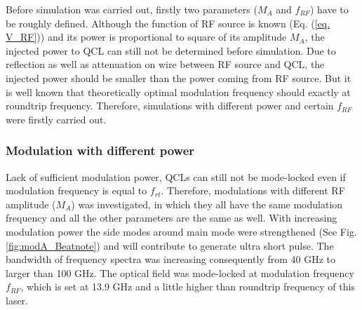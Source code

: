 \documentclass[11pt,final]{scrbook}
\begin{document}
Before simulation was carried out, firstly two parameters ($M_{A}$ and $f_{RF}$) have to be roughly defined. Although the function of RF source is known (Eq. (\ref{eq. V_RF})) and its power is proportional to square of its amplitude $M_{A}$, the injected power to QCL can still not be determined before simulation. Due to reflection as well as attenuation on wire between RF source and QCL, the injected power should be smaller than the power coming from RF source. But it is well known that theoretically optimal modulation frequency should exactly at roundtrip frequency. Therefore, simulations with different power and certain $f_{RF}$ were firstly carried out.
\subsubsection{Modulation with different power} 
Lack of sufficient modulation power, QCLs can still not be mode-locked even if modulation frequency is equal to $f_{rt}$. Therefore, modulations with different RF amplitude ($M_{A}$) was investigated, in which they all have the same modulation frequency and all the other parameters are the same as well. With increasing modulation power the side modes around main mode were strengthened (See Fig. \ref{fig:modA_Beatnote}) and will contribute to generate ultra short pulse. The bandwidth of frequency spectra was increasing consequently from 40 GHz to larger than 100 GHz. The optical field was mode-locked at modulation frequency $f_{RF}$, which is set at 13.9 GHz and a little higher than roundtrip frequency of this laser. 
\end{document}
